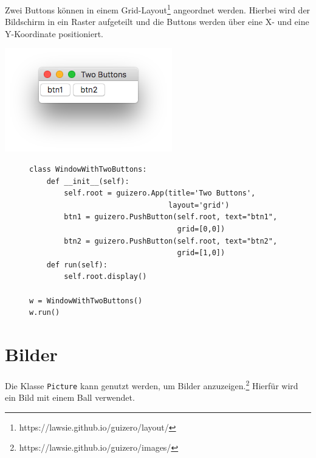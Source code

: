 \documentclass{tufte-handout}
\begin{document}
Zwei Buttons können in einem
Grid-Layout\footnote{https://lawsie.github.io/guizero/layout/} angeordnet
werden. Hierbei wird der Bildschirm in ein Raster aufgeteilt und die Buttons
werden über eine X- und eine Y-Koordinate positioniert.

\begin{marginfigure}[1cm]
	\begin{center}
		\includegraphics[width=\textwidth]{../with_2_buttons.png}
	\end{center}	
\end{marginfigure}

\begin{figure}
\begin{lstlisting}
class WindowWithTwoButtons:
    def __init__(self):
        self.root = guizero.App(title='Two Buttons', 
                                layout='grid')
        btn1 = guizero.PushButton(self.root, text="btn1",
                                  grid=[0,0])
        btn2 = guizero.PushButton(self.root, text="btn2",
                                  grid=[1,0])
    def run(self):
        self.root.display()

w = WindowWithTwoButtons()
w.run()

\end{lstlisting}
\end{figure} 

\section{Bilder}
Die Klasse \lstinline|Picture| kann genutzt werden, um Bilder
anzuzeigen.\footnote{
	https://lawsie.github.io/guizero/images/} Hierfür wird ein
Bild mit einem Ball verwendet.
\end{document}
